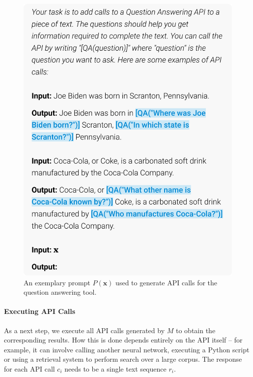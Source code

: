 \documentclass[11pt]{article}
\begin{document}
\begin{CJK*}{UTF8}{gbsn}
\begin{figure}
    \centering
    \includegraphics[width=\linewidth]{figures/prompt.pdf}
    \caption{An exemplary prompt $P(\mathbf{x})$ used to generate API calls for the question answering tool.}
    \label{fig:api_call_prompt}
\end{figure}

\paragraph{Executing API Calls} As a next step, we execute all API calls generated by $M$ to obtain the corresponding results. How this is done depends entirely on the API itself -- for example, it can involve calling another neural network, executing a Python script or using a retrieval system to perform search over a large corpus. The response for each API call $c_i$ needs to be a single text sequence $r_i$.


\end{CJK*}
\end{document}
